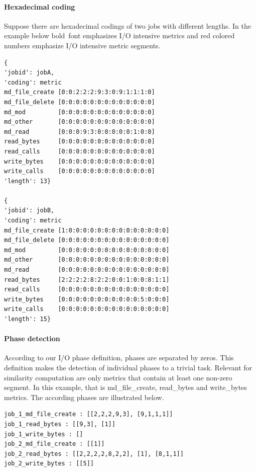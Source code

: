 \documentclass[]{llncs}
\begin{document}
\paragraph{Hexadecimal coding}
Suppose there are hexadecimal codings of two jobs with different lengths.
In the example below bold\ font emphasizes I/O intensive  metrics and red colored numbers emphasize I/O intensive metric segments.

\begin{lstlisting}
{ 
'jobid': jobA,
'coding': metric
md_file_create [0:0:2:2:2:9:3:0:9:1:1:1:0]
md_file_delete [0:0:0:0:0:0:0:0:0:0:0:0:0]
md_mod         [0:0:0:0:0:0:0:0:0:0:0:0:0]
md_other       [0:0:0:0:0:0:0:0:0:0:0:0:0]
md_read        [0:0:0:9:3:0:0:0:0:0:1:0:0]
read_bytes     [0:0:0:0:0:0:0:0:0:0:0:0:0]
read_calls     [0:0:0:0:0:0:0:0:0:0:0:0:0]
write_bytes    [0:0:0:0:0:0:0:0:0:0:0:0:0]
write_calls    [0:0:0:0:0:0:0:0:0:0:0:0:0]
'length': 13} 

{ 
'jobid': jobB,
'coding': metric
md_file_create [1:0:0:0:0:0:0:0:0:0:0:0:0:0:0]
md_file_delete [0:0:0:0:0:0:0:0:0:0:0:0:0:0:0]
md_mod         [0:0:0:0:0:0:0:0:0:0:0:0:0:0:0]
md_other       [0:0:0:0:0:0:0:0:0:0:0:0:0:0:0]
md_read        [0:0:0:0:0:0:0:0:0:0:0:0:0:0:0]
read_bytes     [2:2:2:2:8:2:2:0:0:1:0:0:8:1:1]
read_calls     [0:0:0:0:0:0:0:0:0:0:0:0:0:0:0]
write_bytes    [0:0:0:0:0:0:0:0:0:0:0:5:0:0:0]
write_calls    [0:0:0:0:0:0:0:0:0:0:0:0:0:0:0]
'length': 15} 
\end{lstlisting}
\paragraph{Phase detection}
According to our I/O phase definition, phases are separated by zeros.
This definition makes the detection of individual phases to a trivial task.
Relevant for similarity computation are only metrics that contain at least one non-zero segment.
In this example, that is md\_file\_create, read\_bytes and write\_bytes metrics.
The according phases are illustrated below.
\begin{lstlisting}
job_1_md_file_create : [[2,2,2,9,3], [9,1,1,1]]
job_1_read_bytes : [[9,3], [1]]
job_1_write_bytes : []
job_2_md_file_create : [[1]]
job_2_read_bytes : [[2,2,2,2,8,2,2], [1], [8,1,1]]
job_2_write_bytes : [[5]]
\end{lstlisting}
\end{document}
